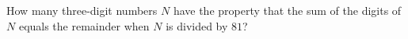 How many three-digit numbers $N$ have the property that the sum of the digits of $N$ equals the remainder when $N$ is divided by $81$?
